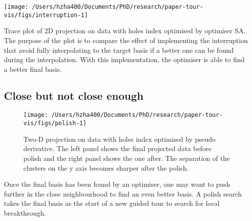 \begin{Schunk}
\begin{widefigure}

{\centering \texttt{[image: /Users/hzha400/Documents/PhD/research/paper-tour-vis/figs/interruption-1]} 

}

\caption[Trace plot of 2D projection on  data with holes index optimised by optimiser SA]{Trace plot of 2D projection on  data with holes index optimised by optimiser SA. The purpose of the plot is to compare the effect of implementing the interruption that avoid fully interpolating to the target basis if a better one can be found during the interpolation. With this implementation, the optimiser is able to find a better final basis.}\label{fig:interruption}
\end{widefigure}
\end{Schunk}

\hypertarget{close-but-not-close-enough}{%
\subsection{Close but not close
enough}\label{close-but-not-close-enough}}

\begin{Schunk}
\begin{figure}

{\centering \texttt{[image: /Users/hzha400/Documents/PhD/research/paper-tour-vis/figs/polish-1]} 

}

\caption[Two-D projection on  data with holes index optimised by pseudo derivative]{Two-D projection on  data with holes index optimised by pseudo derivative. The left panel shows the final projected data before polish and the right panel shows the one after. The separation of the clusters on the y axis becomes sharper after the polish. }\label{fig:polish}
\end{figure}
\end{Schunk}

Once the final basis has been found by an optimiser, one may want to
push further in the close neighbourhood to find an even better basis. A
polish search takes the final basis as the start of a new guided tour to
search for local breakthrough.

